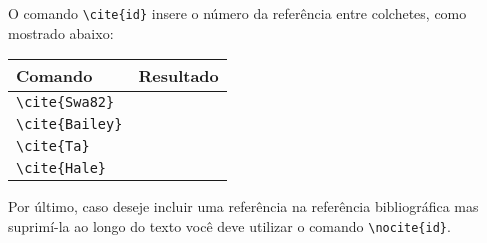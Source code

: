 O comando \lstinline+\cite{id}+ insere o número da referência entre colchetes,
como mostrado abaixo:
\begin{center}
  \centering
  \begin{tabular}{|l|c|}
    \hline
    Comando & Resultado \\ \hline
    \lstinline+\cite{Swa82}+ & \cite{Swa82} \\ \hline
    \lstinline+\cite{Bailey}+ & \cite{Bailey} \\ \hline
    \lstinline+\cite{Ta}+ & \cite{Ta} \\ \hline
    \lstinline+\cite{Hale}+ & \cite{Hale} \\ \hline
  \end{tabular}
\end{center}

Por último, caso deseje incluir uma referência na referência bibliográfica mas
suprimí-la ao longo do texto você deve utilizar o comando
\lstinline+\nocite{id}+.
